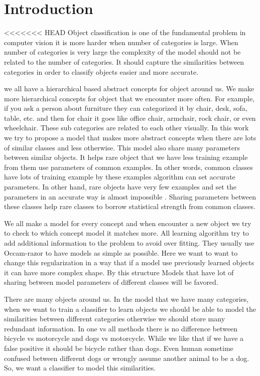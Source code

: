 \documentclass[10pt,twocolumn,letterpaper]{article}
\begin{document}
\section{Introduction}

<<<<<<< HEAD
Object classification is one of the fundamental problem in computer vision it is more harder when number of categories is large. When number of categories is very large the complexity of the model should not be related to the number of categories. It should capture the similarities between categories in order to classify objects easier and more accurate.

we all have a hierarchical based abstract concepts for object around us. We make more hierarchical concepts for object that we encounter more often. For example, if you ask a person about furniture they can categorized it by chair, desk, sofa, table, etc. and then for chair it goes like office chair, armchair, rock chair, or even wheelchair. These sub categories are related to each other visually. In this work we try to propose a model that makes more abstract concepts when there are lots of similar classes and less otherwise. This model also share many parameters between similar objects. It helps rare object that we have less training example from them use parameters of common examples. In other words, common classes have lots of training example by these examples algorithm can set accurate parameters. In other hand, rare objects have very few examples and set the parameters in an accurate way is almost impossible . Sharing parameters between these classes help rare classes to borrow statistical strength from common classes. 

We all make a model for every concept and when encounter a new object we try to check to which concept model it matches more. All learning algorithm try to add additional information to the problem to avoid over fitting. They usually use Occam-razor to have models as simple as possible. Here we want to want to change this regularization in a way that if a model use previously learned objects it can have more complex shape. By this structure Models that have lot of sharing between model parameters of different classes will be favored.

There are many objects around us. In the model that we have many categories, when we want to train a classifier to learn objects we should be able to model the similarities between different categories otherwise we should store many redundant information. In one vs all methods there is no difference between bicycle vs motorcycle and dogs vs motorcycle. While we like that if we have a false positive it should be bicycle rather than dogs. Even human sometime confused between different dogs or wrongly assume another animal to be a dog. So, we want a classifier to model this similarities.  
\end{document}
